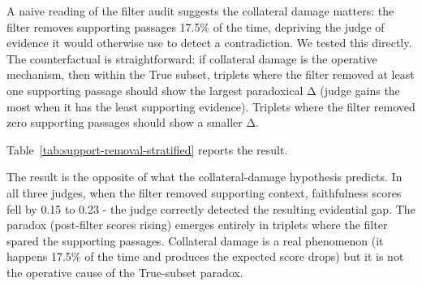 A naive reading of the filter audit suggests the collateral damage matters: the filter removes supporting passages 17.5\% of the time, depriving the judge of evidence it would otherwise use to detect a contradiction. We tested this directly. The counterfactual is straightforward: if collateral damage is the operative mechanism, then within the True subset, triplets where the filter removed at least one supporting passage should show the largest paradoxical Δ (judge gains the most when it has the least supporting evidence). Triplets where the filter removed zero supporting passages should show a smaller Δ.

Table~\ref{tab:support-removal-stratified} reports the result.

\begin{table}[H]
\centering
\small
{}
\caption{True-subset Δ stratified by whether the statistical filter removed at least one supporting passage. The paradox (Δ > 0) appears only in triplets where supporting passages survived the filter. In triplets where collateral damage occurred, scores drop substantially in all three judges.}
\label{tab:support-removal-stratified}
\end{table}

The result is the opposite of what the collateral-damage hypothesis predicts. In all three judges, when the filter removed supporting context, faithfulness scores fell by 0.15 to 0.23 - the judge correctly detected the resulting evidential gap. The paradox (post-filter scores rising) emerges entirely in triplets where the filter spared the supporting passages. Collateral damage is a real phenomenon (it happens 17.5\% of the time and produces the expected score drops) but it is not the operative cause of the True-subset paradox.

